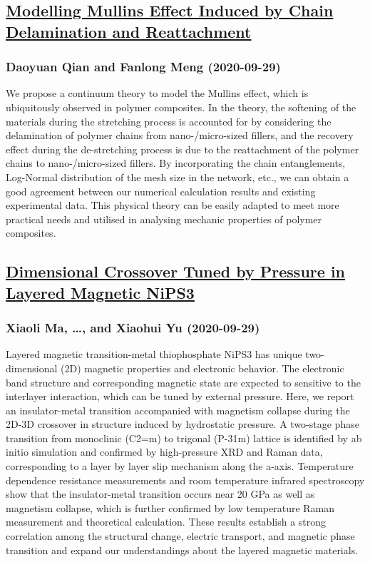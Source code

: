 \subsection*{\href{http://arxiv.org/abs/2009.14055v1}{Modelling Mullins Effect Induced by Chain Delamination and Reattachment}}
\subsubsection*{Daoyuan Qian and Fanlong Meng (2020-09-29)}
We propose a continuum theory to model the Mullins effect, which is
ubiquitously observed in polymer composites. In the theory, the softening of
the materials during the stretching process is accounted for by considering the
delamination of polymer chains from nano-/micro-sized fillers, and the recovery
effect during the de-stretching process is due to the reattachment of the
polymer chains to nano-/micro-sized fillers. By incorporating the chain
entanglements, Log-Normal distribution of the mesh size in the network, etc.,
we can obtain a good agreement between our numerical calculation results and
existing experimental data. This physical theory can be easily adapted to meet
more practical needs and utilised in analysing mechanic properties of polymer
composites.

\subsection*{\href{http://arxiv.org/abs/2009.14051v1}{Dimensional Crossover Tuned by Pressure in Layered Magnetic NiPS3}}
\subsubsection*{Xiaoli Ma, \dots, and Xiaohui Yu (2020-09-29)}
Layered magnetic transition-metal thiophosphate NiPS3 has unique
two-dimensional (2D) magnetic properties and electronic behavior. The
electronic band structure and corresponding magnetic state are expected to
sensitive to the interlayer interaction, which can be tuned by external
pressure. Here, we report an insulator-metal transition accompanied with
magnetism collapse during the 2D-3D crossover in structure induced by
hydrostatic pressure. A two-stage phase transition from monoclinic (C2=m) to
trigonal (P-31m) lattice is identified by ab initio simulation and confirmed by
high-pressure XRD and Raman data, corresponding to a layer by layer slip
mechanism along the a-axis. Temperature dependence resistance measurements and
room temperature infrared spectroscopy show that the insulator-metal transition
occurs near 20 GPa as well as magnetism collapse, which is further confirmed by
low temperature Raman measurement and theoretical calculation. These results
establish a strong correlation among the structural change, electric transport,
and magnetic phase transition and expand our understandings about the layered
magnetic materials.

